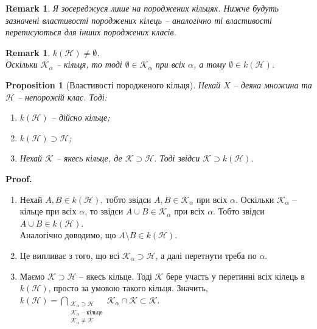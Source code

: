 \documentclass[a4paper, 10pt]{article}
\makeatletter
\theoremstyle{theoremdd}
\newtheorem{proposition}[theorem]{Proposition}
\newtheorem{remark}[theorem]{Remark}
\renewenvironment{proof}[1][Proof.\\]{\par
\pushQED{\hfill \qed}%
\normalfont \topsep6\p@\@plus6\p@\relax
\trivlist
\item\relax
{\bfseries
#1\@addpunct{.}}\hspace\labelsep\ignorespaces
}{%
\popQED\endtrivlist\@endpefalse
}
\newcommand\nospacebeforeitem{
\vspace{-\topsep}
\vspace{-\topsep}
\vspace{-\topsep}
}
\makeatother
\begin{document}
\begin{remark}
Я зосереджуся лише на породжених кільцях. Нижче будуть зазначені властивості породжених кілець -- аналогічно ті властивості переписуються для інших породжених класів.
\end{remark}

\begin{remark}
$k(\mathcal{H}) \neq \emptyset$. \\
Оскільки $\mathcal{K}_\alpha$ -- кільця, то тоді $\emptyset \in \mathcal{K}_\alpha$ при всіх $\alpha$, а тому $\emptyset \in k(\mathcal{H})$.
\end{remark}

\begin{proposition}[Властивості породженого кільця]
Нехай $X$ -- деяка множина та $\mathcal{H}$ -- непорожій клас. Тоді:
\begin{enumerate}[nosep, wide=0pt, label={\arabic*)}]
\item $k(\mathcal{H})$ -- дійсно кільце;
\item $k(\mathcal{H}) \supset \mathcal{H}$;
\item Нехай $\mathcal{K}$ -- якесь кільце, де $\mathcal{K} \supset \mathcal{H}$. Тоді звідси $\mathcal{K} \supset k(\mathcal{H})$.
\end{enumerate}
\end{proposition}

\begin{proof}
\nospacebeforeitem
\begin{enumerate}[wide=0pt, label={\arabic*)}]
\item Нехай $A,B \in k(\mathcal{H})$, тобто звідси $A,B \in \mathcal{K}_\alpha$ при всіх $\alpha$. Оскільки $\mathcal{K}_\alpha$ -- кільце при всіх $\alpha$, то звідси $A \cup B \in \mathcal{K}_\alpha$ при всіх $\alpha$. Тобто звідси $A \cup B \in k(\mathcal{H})$.\\
Аналогічно доводимо, що $A \setminus B \in k(\mathcal{H})$.

\item Це випливає з того, що всі $\mathcal{K}_\alpha \supset \mathcal{H}$, а далі перетнути треба по $\alpha$.

\item Маємо $\mathcal{K} \supset \mathcal{H}$ -- якесь кільце. Тоді $\mathcal{K}$ бере участь у перетинні всіх кілець в $k(\mathcal{H})$, просто за умовою такого кільця. Значить, $k(\mathcal{H}) = \displaystyle\bigcap_{\substack{\mathcal{K}_\alpha \supset \mathcal{H} \\ \mathcal{K}_\alpha \text{ -- кільце} \\ \mathcal{K}_\alpha \neq \mathcal{K}}} \mathcal{K}_\alpha \cap \mathcal{K} \subset \mathcal{K}$. \qedhere
\end{enumerate}
\end{proof}
\end{document}
